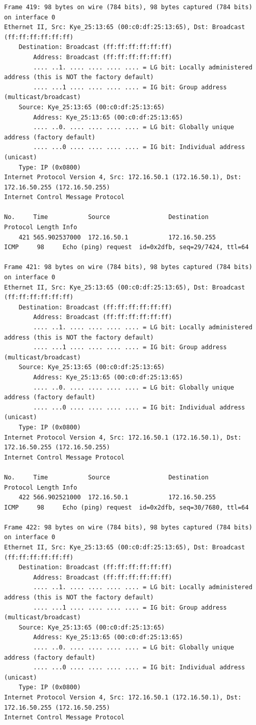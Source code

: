 \documentclass[a4paper,11pt]{article}
\begin{document}
\begin{lstlisting}
Frame 419: 98 bytes on wire (784 bits), 98 bytes captured (784 bits) on interface 0
Ethernet II, Src: Kye_25:13:65 (00:c0:df:25:13:65), Dst: Broadcast (ff:ff:ff:ff:ff:ff)
    Destination: Broadcast (ff:ff:ff:ff:ff:ff)
        Address: Broadcast (ff:ff:ff:ff:ff:ff)
        .... ..1. .... .... .... .... = LG bit: Locally administered address (this is NOT the factory default)
        .... ...1 .... .... .... .... = IG bit: Group address (multicast/broadcast)
    Source: Kye_25:13:65 (00:c0:df:25:13:65)
        Address: Kye_25:13:65 (00:c0:df:25:13:65)
        .... ..0. .... .... .... .... = LG bit: Globally unique address (factory default)
        .... ...0 .... .... .... .... = IG bit: Individual address (unicast)
    Type: IP (0x0800)
Internet Protocol Version 4, Src: 172.16.50.1 (172.16.50.1), Dst: 172.16.50.255 (172.16.50.255)
Internet Control Message Protocol

No.     Time           Source                Destination           Protocol Length Info
    421 565.902537000  172.16.50.1           172.16.50.255         ICMP     98     Echo (ping) request  id=0x2dfb, seq=29/7424, ttl=64

Frame 421: 98 bytes on wire (784 bits), 98 bytes captured (784 bits) on interface 0
Ethernet II, Src: Kye_25:13:65 (00:c0:df:25:13:65), Dst: Broadcast (ff:ff:ff:ff:ff:ff)
    Destination: Broadcast (ff:ff:ff:ff:ff:ff)
        Address: Broadcast (ff:ff:ff:ff:ff:ff)
        .... ..1. .... .... .... .... = LG bit: Locally administered address (this is NOT the factory default)
        .... ...1 .... .... .... .... = IG bit: Group address (multicast/broadcast)
    Source: Kye_25:13:65 (00:c0:df:25:13:65)
        Address: Kye_25:13:65 (00:c0:df:25:13:65)
        .... ..0. .... .... .... .... = LG bit: Globally unique address (factory default)
        .... ...0 .... .... .... .... = IG bit: Individual address (unicast)
    Type: IP (0x0800)
Internet Protocol Version 4, Src: 172.16.50.1 (172.16.50.1), Dst: 172.16.50.255 (172.16.50.255)
Internet Control Message Protocol

No.     Time           Source                Destination           Protocol Length Info
    422 566.902521000  172.16.50.1           172.16.50.255         ICMP     98     Echo (ping) request  id=0x2dfb, seq=30/7680, ttl=64

Frame 422: 98 bytes on wire (784 bits), 98 bytes captured (784 bits) on interface 0
Ethernet II, Src: Kye_25:13:65 (00:c0:df:25:13:65), Dst: Broadcast (ff:ff:ff:ff:ff:ff)
    Destination: Broadcast (ff:ff:ff:ff:ff:ff)
        Address: Broadcast (ff:ff:ff:ff:ff:ff)
        .... ..1. .... .... .... .... = LG bit: Locally administered address (this is NOT the factory default)
        .... ...1 .... .... .... .... = IG bit: Group address (multicast/broadcast)
    Source: Kye_25:13:65 (00:c0:df:25:13:65)
        Address: Kye_25:13:65 (00:c0:df:25:13:65)
        .... ..0. .... .... .... .... = LG bit: Globally unique address (factory default)
        .... ...0 .... .... .... .... = IG bit: Individual address (unicast)
    Type: IP (0x0800)
Internet Protocol Version 4, Src: 172.16.50.1 (172.16.50.1), Dst: 172.16.50.255 (172.16.50.255)
Internet Control Message Protocol


\end{lstlisting}
\end{document}
